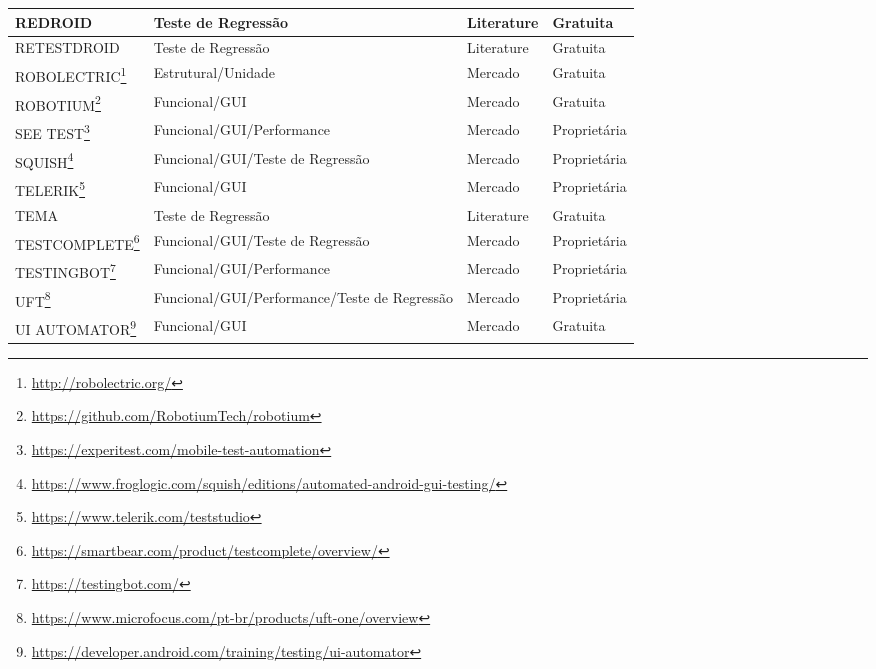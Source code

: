 \begin{table}[h!]
\begin{center}
\begin{tabular}{m{4cm}m{5cm}m{3cm}m{3cm}}
        REDROID \cite{Do2016RedroidAR} & Teste de Regressão & Literature & Gratuita\\\hline
        RETESTDROID \cite{8377661} & Teste de Regressão & Literature & Gratuita\\\hline
        ROBOLECTRIC\footnote{\url{http://robolectric.org/}} & Estrutural/Unidade & Mercado & Gratuita\\\hline
        ROBOTIUM\footnote{\url{https://github.com/RobotiumTech/robotium}} & Funcional/GUI & Mercado & Gratuita\\\hline
        SEE TEST\footnote{\url{https://experitest.com/mobile-test-automation}} & Funcional/GUI/Performance & Mercado & Proprietária\\\hline
        SQUISH\footnote{\url{https://www.froglogic.com/squish/editions/automated-android-gui-testing/}} & Funcional/GUI/Teste de Regressão & Mercado & Proprietária\\\hline
        TELERIK\footnote{\url{https://www.telerik.com/teststudio}} & Funcional/GUI & Mercado & Proprietária\\\hline
        TEMA \cite{5770627} & Teste de Regressão & Literature & Gratuita\\\hline
        TESTCOMPLETE\footnote{\url{https://smartbear.com/product/testcomplete/overview/}} & Funcional/GUI/Teste de Regressão & Mercado & Proprietária\\\hline
        TESTINGBOT\footnote{\url{https://testingbot.com/}} & Funcional/GUI/Performance & Mercado & Proprietária\\\hline
        UFT\footnote{\url{https://www.microfocus.com/pt-br/products/uft-one/overview}} & Funcional/GUI/Performance/Teste de Regressão & Mercado & Proprietária\\\hline
        UI AUTOMATOR\footnote{\url{https://developer.android.com/training/testing/ui-automator}} & Funcional/GUI & Mercado & Gratuita\\\hline
\end{tabular}
\end{center}
\end{table}

